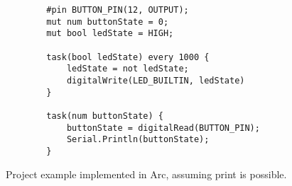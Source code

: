 \begin{listing}[htb!]
    \begin{verbatim}
        #pin BUTTON_PIN(12, OUTPUT);
        mut num buttonState = 0;
        mut bool ledState = HIGH;

        task(bool ledState) every 1000 {
            ledState = not ledState;
            digitalWrite(LED_BUILTIN, ledState)
        }

        task(num buttonState) {
            buttonState = digitalRead(BUTTON_PIN);
            Serial.Println(buttonState);
        }
    \end{verbatim}
    \caption{Project example implemented in Arc, assuming print is possible.}
    \label{lst:arcexample}
\end{listing}